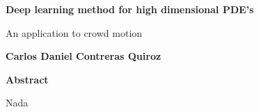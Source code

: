 

\fancyhf{} %
\fancyhead[RO,R]{\thepage} %
\renewcommand{\headrulewidth}{0pt}

\begin{center}
    \Large
    \textbf{Deep learning method for high dimensional PDE's}
    
    \vspace{0.4cm}
    \large
    An application to crowd motion
    
    \vspace{0.4cm}
    \textbf{Carlos Daniel Contreras Quiroz}
    
    \vspace{0.9cm}
    \textbf{Abstract}
\end{center}
Nada